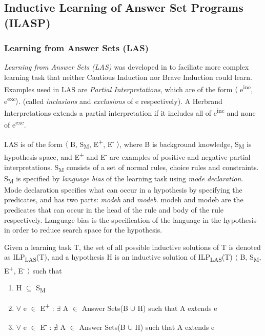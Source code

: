 \documentclass[12pt,twoside]{report}
\begin{document}
\subsection{Inductive Learning of Answer Set Programs (ILASP)}
\label{section_lasp}

\subsubsection{Learning from Answer Sets (LAS)}
\textit{Learning from Answer Sets (LAS)} was developed in \cite{Law2014} to faciliate more complex learning task that neither Cautious Induction nor Brave Induction could learn.
Examples used in LAS are \textit{Partial Interpretations}, which are of the form $\langle$ e\textsuperscript{inc}, e\textsuperscript{exc}$\rangle$. (called \textit{inclusions} and \textit{exclusions} of e respectively).  A Herbrand Interpretations extends a partial interpretation if it includes all of e\textsuperscript{inc} and none of e\textsuperscript{exc}.

LAS is of the form $\langle$ B, S\textsubscript{M}, E\textsuperscript{+}, E\textsuperscript{-} $\rangle$, where B is background knowledge, S\textsubscript{M} is hypothesis space, and E\textsuperscript{+} and E\textsuperscript{-} are examples of positive and negative partial interpretations. S\textsubscript{M} consists of a set of normal rules, choice rules and constraints. S\textsubscript{M} is specified by \textit{language bias} of the learning task using \textit{mode declaration}. Mode declaration specifies what can occur in a hypothesis by specifying the predicates, and has two parts: \textit{modeh} and \textit{modeb}.  modeh and modeb are the predicates that can occur in the head of the rule and body of the rule respectively. Language bias is the specification of the language in the hypothesis in order to reduce search space for the hypothesis.

Given a learning task T, the set of all possible inductive solutions of T is denoted as ILP\textsubscript{LAS}(T), and a hypothesis H is an inductive solution of ILP\textsubscript{LAS}(T) $\langle$ B, S\textsubscript{M}, E\textsuperscript{+}, E\textsuperscript{-} $\rangle$ such that
\begin{enumerate}
\item H $\subseteq$ S\textsubscript{M}
\item $\forall$ e $\in$ E\textsuperscript{+} : $\exists$ A $\in$ Answer Sets(B $\cup$ H) such that A extends e
\item $\forall$ e $\in$ E\textsuperscript{-} : $\nexists$ A $\in$ Answer Sets(B $\cup$ H) such that A extends e
\end{enumerate}
\end{document}
